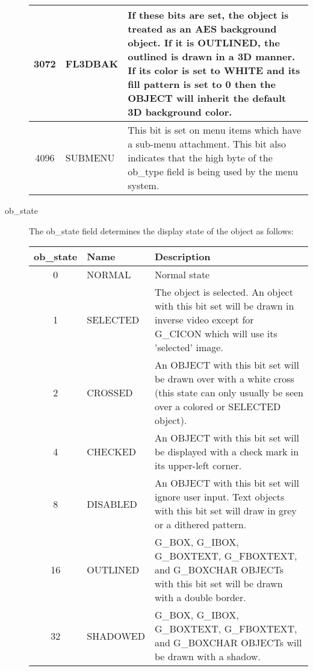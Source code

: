 \begin{description}
\begin{center}
\begin{longtable}{|clp{9cm}|}
3072 & FL3DBAK & If these bits are set, the object is treated as an AES background object.  
                 If it is OUTLINED, the outlined is drawn in a 3D manner. If its color
                 is set to WHITE and its fill pattern is set to 0 then the OBJECT will inherit 
                 the default 3D background color.\\\hline
4096 & SUBMENU & This bit is set on menu items which have a sub-menu attachment. This bit also
                 indicates that the high byte of the ob\_type field is being used by the menu
                 system.\\\hline
\end{longtable}\end{center}

\item[ob\_state] The ob\_state field determines the display state of the object as
follows:

\begin{center}\begin{longtable}{|clp{9cm}|}
\hline
{\bf ob\_state} & {\bf Name} & {\bf Description}\\
\hline
0 & NORMAL   & Normal state \\\hline
1 & SELECTED & The object is selected. An object with this bit set will be drawn in inverse
               video except for G\_CICON which will use its 'selected' image.\\\hline
2 & CROSSED  & An OBJECT with this bit set will be drawn over with a white cross (this   
               state can only usually be seen over a colored or	SELECTED object).\\\hline
4 & CHECKED  & An OBJECT with this bit set will be displayed with a check mark in its    
               upper-left corner.\\\hline
8 & DISABLED & An OBJECT with this bit set will ignore user input. Text objects with this   
               bit set will draw in grey or a dithered pattern.\\\hline
16 & OUTLINED & G\_BOX, G\_IBOX, G\_BOXTEXT, G\_FBOXTEXT, and G\_BOXCHAR OBJECTs   
               with this bit set will be drawn with a double border.\\\hline
32 & SHADOWED & G\_BOX, G\_IBOX, G\_BOXTEXT, G\_FBOXTEXT, and G\_BOXCHAR OBJECTs   
                will be drawn with a shadow.\\\hline
\end{longtable}\end{center}


\end{description}
